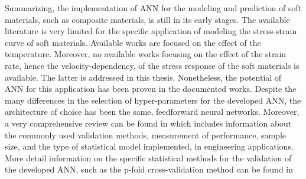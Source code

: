 Summarizing, the implementation of ANN for the modeling and prediction of soft materials, such as composite materials, is still in its early stages. The available literature is very limited for the specific application of modeling the stress-strain curve of soft materials. Available works are focused on the effect of the temperature. Moreover, no available works focusing on the effect of the strain rate, hence the velocity-dependency, of the stress response of the soft materials is available. The latter is addressed in this thesis. Nonetheless, the potential of ANN for this application has been proven in the documented works. Despite the many differences in the selection of hyper-parameters for the developed ANN, the architecture of choice has been the same, feedforward neural networks. Moreover, a very comprehensive review can be found in \cite{paliwal2009neural} which includes information about the commonly used validation methods, measurement of performance, sample size, and the type of statistical model implemented, in engineering applications. More detail information on the specific statistical methods for the validation of the developed ANN, such as the p-fold cross-validation method can be found in \cite{wang2007review,koskela2003neural}





